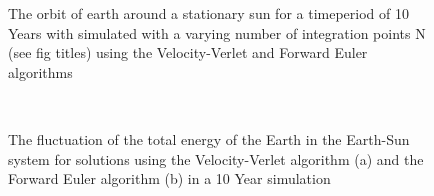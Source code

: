 \documentclass[10pt,showpacs,preprintnumbers,footinbib,amsmath,amssymb,aps,prl,twocolumn,groupedaddress,superscriptaddress,showkeys]{revtex4-1}
\begin{document}
\begin{figure}[h!p]
  \caption{The orbit of earth around a stationary sun for a timeperiod of 10 Years with simulated with a varying number of integration points N (see fig titles) using the Velocity-Verlet and Forward Euler algorithms}
  \label{fig:3c_earthsun}
\end{figure}
 
\begin{figure}
  \center
  \\
   \caption{The fluctuation of the total energy of the Earth in the Earth-Sun system for solutions using the Velocity-Verlet algorithm (a) and the Forward Euler algorithm (b) in a 10 Year simulation}
   \label{fig:c_energy}
\end{figure}
\end{document}
